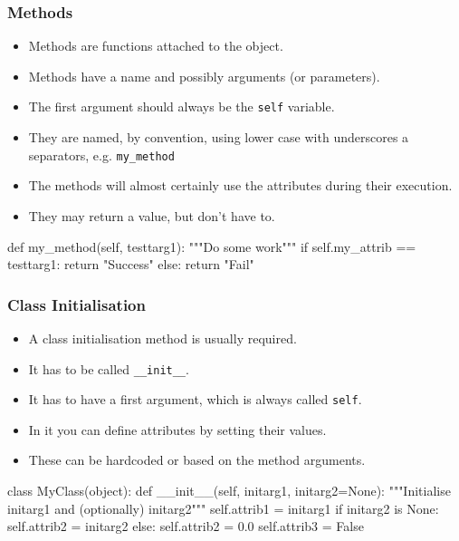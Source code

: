 \documentclass{beamer}
\begin{document}
\begin{frame}[fragile]
\frametitle{Methods}
\begin{itemize}
\item Methods are functions attached to the object.
\item Methods have a name and possibly arguments (or parameters).
\item The first argument should always be the \lstinline|self| variable.
\item They are named, by convention, using lower case with underscores a separators, 
e.g. \lstinline|my_method|
\item The methods will almost certainly use the attributes during their execution.
\item They may return a value, but don't have to.
\end{itemize}

\begin{code}
  def my_method(self, testtarg1):
    """Do some work"""
    if self.my_attrib == testtarg1:
    	return "Success"
    else:
    	return "Fail"
\end{code}

\end{frame}

\begin{frame}[fragile]
\frametitle{Class Initialisation}
\begin{itemize}
\item A class initialisation method is usually required.
\item It has to be called \lstinline|__init__|.
\item It has to have a first argument, which is always called \lstinline|self|.
\item In it you can define attributes by setting their values.
\item These can be hardcoded or based on the method arguments.
\end{itemize}

\begin{code}
class MyClass(object):
  def __init__(self, initarg1, initarg2=None):
    """Initialise initarg1 and (optionally) initarg2"""
    self.attrib1 = initarg1
    if initarg2 is None:
      self.attrib2 = initarg2
    else:
      self.attrib2 = 0.0
    self.attrib3 = False
\end{code}

\end{frame}
\end{document}
